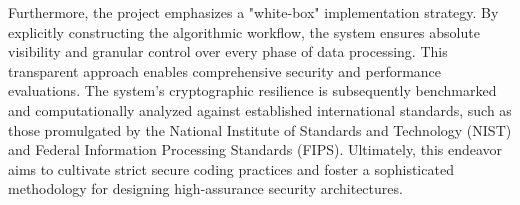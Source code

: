 Furthermore, the project emphasizes a "white-box" implementation strategy. By explicitly constructing the algorithmic workflow, the system ensures absolute visibility and granular control over every phase of data processing. This transparent approach enables comprehensive security and performance evaluations. The system's cryptographic resilience is subsequently benchmarked and computationally analyzed against established international standards, such as those promulgated by the National Institute of Standards and Technology (NIST) and Federal Information Processing Standards (FIPS). Ultimately, this endeavor aims to cultivate strict secure coding practices and foster a sophisticated methodology for designing high-assurance security architectures.
